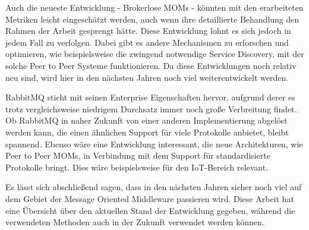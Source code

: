 Auch die neueste Entwicklung - Brokerlose MOMs - könnten mit den erarbeiteten
Metriken leicht eingeschätzt werden, auch wenn ihre detaillierte Behandlung
den Rahmen der Arbeit gesprengt hätte.
Diese Entwicklung lohnt es sich jedoch in jedem Fall zu verfolgen.
Dabei gibt es andere Mechanismen zu erforschen und optimieren, wie beispielsweise
die zwingend notwendige Service Discovery, mit der solche Peer to Peer Systeme
funktionieren. Da diese Entwicklungen noch relativ neu sind, wird hier in den
nächsten Jahren noch viel weiterentwickelt werden.

RabbitMQ sticht mit seinen Enterprise Eigenschaften hervor, aufgrund derer es
trotz vergleichsweise niedrigem Durchsatz immer noch große Verbreitung findet.
Ob RabbitMQ in naher Zukunft von einer anderen Implementierung abgelöst werden
kann, die einen ähnlichen Support für viele Protokolle anbietet, bleibt
spannend. Ebenso wäre eine Entwicklung interessant, die neue Architekturen,
wie Peer to Peer MOMs, in Verbindung mit dem Support für standardisierte
Protokolle bringt. Dies wäre beispielsweise für den IoT-Bereich relevant.

Es lässt sich abschließend sagen, dass in den nächsten Jahren sicher noch viel
auf dem Gebiet der Message Oriented Middleware passieren wird. Diese Arbeit hat
eine Übersicht über den aktuellen Stand der Entwicklung gegeben, während die
verwendeten Methoden auch in der Zukunft verwendet werden können.
